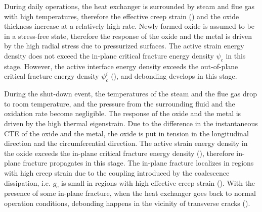 



During daily operations, the heat exchanger is surrounded by steam and flue gas with high temperatures, therefore the effective creep strain () and the oxide thickness increase at a relatively high rate. Newly formed oxide is assumed to be in a stress-free state, therefore the response of the oxide and the metal is driven by the high radial stress due to pressurized surfaces. The active strain energy density does not exceed the in-plane critical fracture energy density $\psi_c$ in this stage. However, the active interface energy density exceeds the out-of-plane critical fracture energy density $\psi_c^i$ (), and debonding develops in this stage.







During the shut-down event, the temperatures of the steam and the flue gas drop to room temperature, and the pressure from the surrounding fluid and the oxidation rate become negligible. The response of the oxide and the metal is driven by the high thermal eigenstrain. Due to the difference in the instantaneous CTE of the oxide and the metal, the oxide is put in tension in the longitudinal direction and the circumferential direction. The active strain energy density in the oxide exceeds the in-plane critical fracture energy density (), therefore in-plane fracture propagates in this stage. The in-plane fracture localizes in regions with high creep strain due to the coupling introduced by the coalescence dissipation, i.e. $g_c$ is small in regions with high effective creep strain (). With the presence of some in-plane fracture, when the heat exchanger goes back to normal operation conditions, debonding happens in the vicinity of transverse cracks ().
